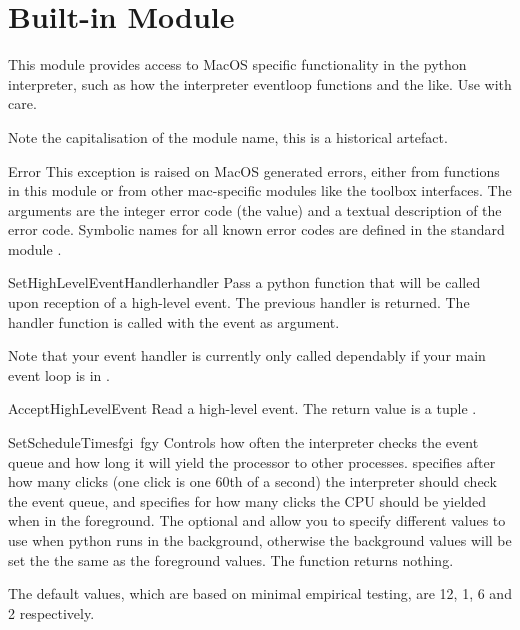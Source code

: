 \section{Built-in Module }
\label{module-MacOS}

\renewcommand{\indexsubitem}{(in module MacOS)}

This module provides access to MacOS specific functionality in the
python interpreter, such as how the interpreter eventloop functions
and the like. Use with care.

Note the capitalisation of the module name, this is a historical
artefact.

\begin{excdesc}{Error}
This exception is raised on MacOS generated errors, either from
functions in this module or from other mac-specific modules like the
toolbox interfaces. The arguments are the integer error code (the
 value) and a textual description of the error code.
Symbolic names for all known error codes are defined in the standard
module .
\end{excdesc}

\begin{funcdesc}{SetHighLevelEventHandler}{handler}
Pass a python function that will be called upon reception of a
high-level event. The previous handler is returned. The handler
function is called with the event as argument.

Note that your event handler is currently only called dependably if
your main event loop is in .
\end{funcdesc}

\begin{funcdesc}{AcceptHighLevelEvent}{}
Read a high-level event. The return value is a tuple .
\end{funcdesc}

\begin{funcdesc}{SetScheduleTimes}{fgi\, fgy }
Controls how often the interpreter checks the event queue and how
long it will yield the processor to other processes. 
specifies after how many clicks (one click is one 60th of a second)
the interpreter should check the event queue, and  specifies
for how many clicks the CPU should be yielded when in the
foreground. The optional  and  allow you to specify
different values to use when python runs in the background, otherwise
the background values will be set the the same as the foreground
values. The function returns nothing.

The default values, which are based on minimal empirical testing, are 12, 1, 6
and 2 respectively.
\end{funcdesc}

